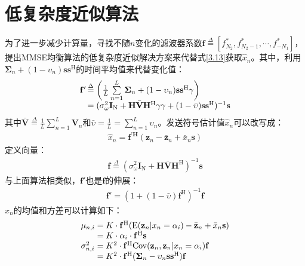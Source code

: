 \section{低复杂度近似算法}
为了进一步减少计算量，寻找不随$n$变化的滤波器系数$\mathbf{f}\overset{\Delta}{=}[f_{N_2}^*,f_{N_2-1}^*,\cdots,f_{-N_1}^*]$，提出MMSE均衡算法的低复杂度近似解决方案来代替式\ref{3.13}获取$\hat{x}_n$。其中，利用$\boldsymbol{\Sigma}_n+(1-\upsilon_n)\mathbf{s}\mathbf{s}^{\mathrm{H}}$的时间平均值来代替变化值：
\begin{eqnarray}
    \begin{array}{l@{\,}l}
        {\mathbf{f}}'&\overset{\Delta}{=}\left(\frac{1}{L}\sum\limits_{n=1}^{L}\boldsymbol{\Sigma}_n+(1-\upsilon_n)\mathbf{s}\mathbf{s}^{\mathrm{H}}\gamma\right)\\
        &=(\sigma_{\omega}^2\mathbf{I}_{\mathrm{N}}+\mathbf{H}\bar{\mathbf{V}}\mathbf{H}^{\mathrm{H}}\gamma\gamma+(1-\bar{\upsilon})\mathbf{s}\mathbf{s}^{\mathrm{H}})^{-1}\mathbf{s}
    \end{array}
    \label{equ:3.30}
\end{eqnarray}
其中$\bar{\mathbf{V}}\overset{\Delta}{=}\frac{1}{L}\sum_{n=1}^L\mathbf{V}_n$和$\bar{\upsilon}=\frac{1}{L}=\sum_{n=1}^L\upsilon_n$。发送符号估计值$\hat{x}_n$可以改写成：
\begin{eqnarray}
    \hat{x}_n=\mathbf{f}^{'\mathbf{H}}(\mathbf{z}_n-\bar{\mathbf{z}}_n+\bar{x}_n\mathbf{s})
    \label{equ:3.31}
\end{eqnarray}
定义向量：
\begin{eqnarray}
    \mathbf{f}\overset{\Delta}{=}(\sigma_{\omega}^2\mathbf{I}_{\mathrm{N}}+\mathbf{H}\bar{\mathbf{V}}\mathbf{H}^{\mathrm{H}})^{-1}\mathbf{s}
    \label{equ:3.32}
\end{eqnarray}
与上面算法相类似，${\mathbf{f}}'$也是$\mathbf{f}$的伸展：
\begin{eqnarray}
    {\mathbf{f}}'=(1+(1-\bar{\upsilon})\mathbf{f}^{\mathrm{H}})^{-1}\mathbf{f}
    \label{equ:3.33}
\end{eqnarray}
$\hat{x}_n$的均值和方差可以计算如下：
\begin{eqnarray}
    \begin{array}{l@{\;=\;}l}
        \mu_{n,i}&K\cdot\mathbf{f}^{\mathrm{H}}(\mathrm{E}(\mathbf{z}_n|x_n=\alpha_i)-\bar{\mathbf{z}}_n+\bar{x}_n\mathbf{s})\\
        &K\cdot\alpha_i\cdot\mathbf{f}^{\mathrm{H}}\mathbf{s}\\
        \sigma_{n,i}^2&K^2\cdot\mathbf{f}^{\mathrm{H}}\mathrm{Cov}(\mathbf{z}_n,\mathbf{z}_n|x_n=\alpha_i)\mathbf{f}\\
        &K^2\cdot\mathbf{f}^{\mathrm{H}}(\boldsymbol{\Sigma}_n-\upsilon_n\mathbf{s}\mathbf{s}^{\mathrm{H}})\mathbf{f}
    \end{array}
    \label{equ:3.34}
\end{eqnarray}
